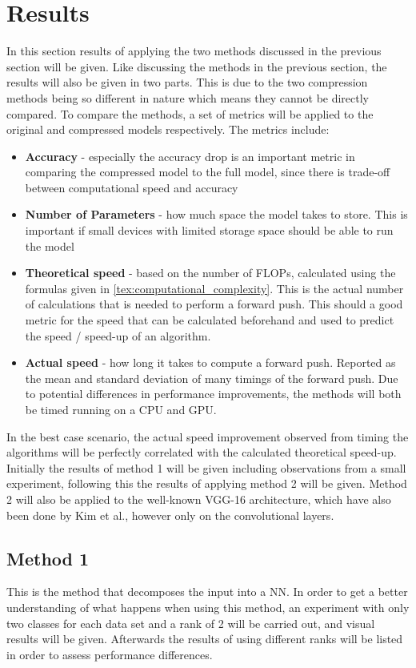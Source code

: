 \section{Results} \label{tex:results}
In this section results of applying the two methods discussed in the previous section will be given. Like discussing the methods in the previous section, the results will also be given in two parts. This is due to the two compression methods being so different in nature which means they cannot be directly compared. To compare the methods, a set of metrics will be applied to the original and compressed models respectively. The metrics include:
\begin{itemize}
    \item \textbf{Accuracy} - especially the accuracy drop is an important metric in comparing the compressed model to the full model, since there is trade-off between computational speed and accuracy
    \item \textbf{Number of Parameters} - how much space the model takes to store. This is important if small devices with limited storage space should be able to run the model
    \item \textbf{Theoretical speed} - based on the number of FLOPs, calculated using the formulas given in \autoref{tex:computational_complexity}. This is the actual number of calculations that is needed to perform a forward push. This should a good metric for the speed that can be calculated beforehand and used to predict the speed / speed-up of an algorithm.
    \item \textbf{Actual speed} - how long it takes to compute a forward push. Reported as the mean and standard deviation of many timings of the forward push. Due to potential differences in performance improvements, the methods will both be timed running on a CPU and GPU.
\end{itemize}
In the best case scenario, the actual speed improvement observed from timing the algorithms will be perfectly correlated with the calculated theoretical speed-up. Initially the results of method 1 will be given including observations from a small experiment, following this the results of applying method 2 will be given. Method 2 will also be applied to the well-known VGG-16 architecture\cite{Simonyan2015}, which have also been done by Kim et al.\cite{Kim2016}, however only on the convolutional layers.

\subsection{Method 1}
This is the method that decomposes the input into a NN. In order to get a better understanding of what happens when using this method, an experiment with only two classes for each data set and a rank of 2 will be carried out, and visual results will be given. Afterwards the results of using different ranks will be listed in order to assess performance differences.


